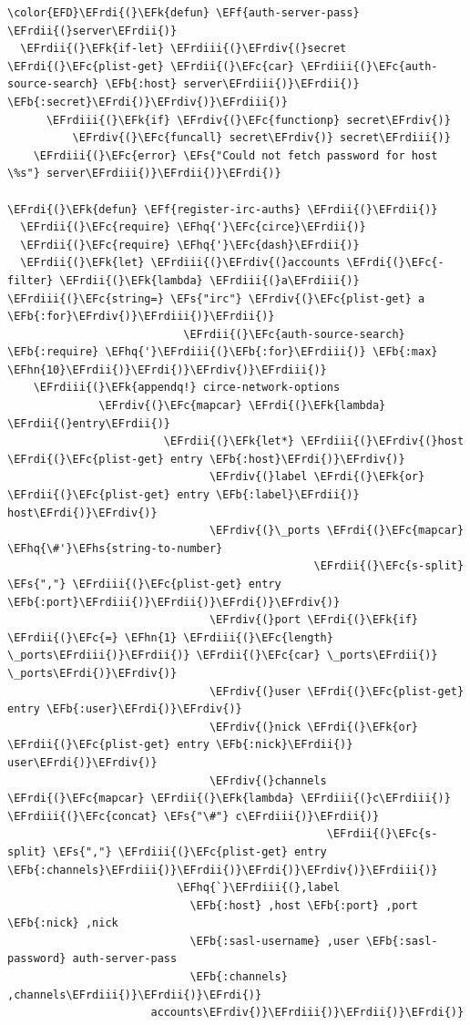 \documentclass{scrartcl}
\newcommand{\EFk}[1]{\textcolor{EFk}{#1}} %
\newcommand{\EFs}[1]{\textcolor{EFs}{#1}} %
\newcommand{\EFb}[1]{\textcolor{EFb}{#1}} %
\newcommand{\EFc}[1]{\textcolor{EFc}{#1}} %
\newcommand{\EFf}[1]{\textcolor{EFf}{#1}} %
\newcommand{\EFhn}[1]{\textcolor{EFhn}{\textbf{#1}}} %
\newcommand{\EFhq}[1]{\textcolor{EFhq}{#1}} %
\newcommand{\EFhs}[1]{\textcolor{EFhs}{#1}} %
\newcommand{\EFrdi}[1]{\textcolor{EFrdi}{#1}} %
\newcommand{\EFrdii}[1]{\textcolor{EFrdii}{#1}} %
\newcommand{\EFrdiii}[1]{\textcolor{EFrdiii}{#1}} %
\newcommand{\EFrdiv}[1]{\textcolor{EFrdiv}{#1}} %
\begin{document}
\begin{Code}
\begin{Verbatim}[]
\color{EFD}\EFrdi{(}\EFk{defun} \EFf{auth-server-pass} \EFrdii{(}server\EFrdii{)}
  \EFrdii{(}\EFk{if-let} \EFrdiii{(}\EFrdiv{(}secret \EFrdi{(}\EFc{plist-get} \EFrdii{(}\EFc{car} \EFrdiii{(}\EFc{auth-source-search} \EFb{:host} server\EFrdiii{)}\EFrdii{)} \EFb{:secret}\EFrdi{)}\EFrdiv{)}\EFrdiii{)}
      \EFrdiii{(}\EFk{if} \EFrdiv{(}\EFc{functionp} secret\EFrdiv{)}
          \EFrdiv{(}\EFc{funcall} secret\EFrdiv{)} secret\EFrdiii{)}
    \EFrdiii{(}\EFc{error} \EFs{"Could not fetch password for host \%s"} server\EFrdiii{)}\EFrdii{)}\EFrdi{)}

\EFrdi{(}\EFk{defun} \EFf{register-irc-auths} \EFrdii{(}\EFrdii{)}
  \EFrdii{(}\EFc{require} \EFhq{'}\EFc{circe}\EFrdii{)}
  \EFrdii{(}\EFc{require} \EFhq{'}\EFc{dash}\EFrdii{)}
  \EFrdii{(}\EFk{let} \EFrdiii{(}\EFrdiv{(}accounts \EFrdi{(}\EFc{-filter} \EFrdii{(}\EFk{lambda} \EFrdiii{(}a\EFrdiii{)} \EFrdiii{(}\EFc{string=} \EFs{"irc"} \EFrdiv{(}\EFc{plist-get} a \EFb{:for}\EFrdiv{)}\EFrdiii{)}\EFrdii{)}
                           \EFrdii{(}\EFc{auth-source-search} \EFb{:require} \EFhq{'}\EFrdiii{(}\EFb{:for}\EFrdiii{)} \EFb{:max} \EFhn{10}\EFrdii{)}\EFrdi{)}\EFrdiv{)}\EFrdiii{)}
    \EFrdiii{(}\EFk{appendq!} circe-network-options
              \EFrdiv{(}\EFc{mapcar} \EFrdi{(}\EFk{lambda} \EFrdii{(}entry\EFrdii{)}
                        \EFrdii{(}\EFk{let*} \EFrdiii{(}\EFrdiv{(}host \EFrdi{(}\EFc{plist-get} entry \EFb{:host}\EFrdi{)}\EFrdiv{)}
                               \EFrdiv{(}label \EFrdi{(}\EFk{or} \EFrdii{(}\EFc{plist-get} entry \EFb{:label}\EFrdii{)} host\EFrdi{)}\EFrdiv{)}
                               \EFrdiv{(}\_ports \EFrdi{(}\EFc{mapcar} \EFhq{\#'}\EFhs{string-to-number}
                                               \EFrdii{(}\EFc{s-split} \EFs{","} \EFrdiii{(}\EFc{plist-get} entry \EFb{:port}\EFrdiii{)}\EFrdii{)}\EFrdi{)}\EFrdiv{)}
                               \EFrdiv{(}port \EFrdi{(}\EFk{if} \EFrdii{(}\EFc{=} \EFhn{1} \EFrdiii{(}\EFc{length} \_ports\EFrdiii{)}\EFrdii{)} \EFrdii{(}\EFc{car} \_ports\EFrdii{)} \_ports\EFrdi{)}\EFrdiv{)}
                               \EFrdiv{(}user \EFrdi{(}\EFc{plist-get} entry \EFb{:user}\EFrdi{)}\EFrdiv{)}
                               \EFrdiv{(}nick \EFrdi{(}\EFk{or} \EFrdii{(}\EFc{plist-get} entry \EFb{:nick}\EFrdii{)} user\EFrdi{)}\EFrdiv{)}
                               \EFrdiv{(}channels \EFrdi{(}\EFc{mapcar} \EFrdii{(}\EFk{lambda} \EFrdiii{(}c\EFrdiii{)} \EFrdiii{(}\EFc{concat} \EFs{"\#"} c\EFrdiii{)}\EFrdii{)}
                                                 \EFrdii{(}\EFc{s-split} \EFs{","} \EFrdiii{(}\EFc{plist-get} entry \EFb{:channels}\EFrdiii{)}\EFrdii{)}\EFrdi{)}\EFrdiv{)}\EFrdiii{)}
                          \EFhq{`}\EFrdiii{(},label
                            \EFb{:host} ,host \EFb{:port} ,port \EFb{:nick} ,nick
                            \EFb{:sasl-username} ,user \EFb{:sasl-password} auth-server-pass
                            \EFb{:channels} ,channels\EFrdiii{)}\EFrdii{)}\EFrdi{)}
                      accounts\EFrdiv{)}\EFrdiii{)}\EFrdii{)}\EFrdi{)}
\end{Verbatim}
\end{Code}
\end{document}

